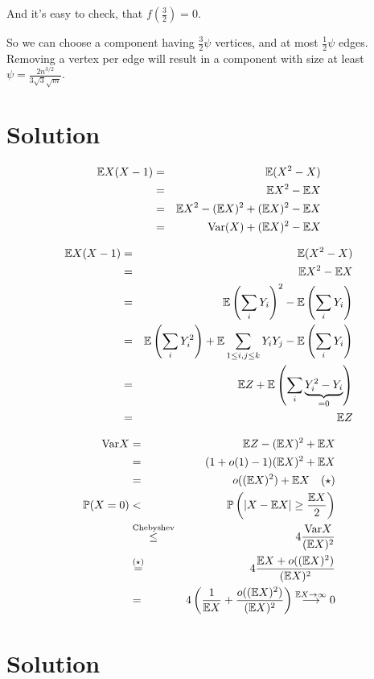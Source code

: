 \documentclass[a4paper]{article}
\begin{document}
And it's easy to check, that $ f(\frac{3}{2}) = 0 $.

So we can choose a component having $ \frac{3}{2} \psi $ vertices, and at most
$ \frac{1}{2} \psi $ edges. Removing a vertex per edge will result in
a component with size at least $ \psi = \frac{2n^{3/2}}{3\sqrt{3}\sqrt{m}} $. \endproof

\section{Solution}

\begin{eqnarray*}
  \mathbb{E} X(X-1) &=& \mathbb{E} (X^2 - X) \\
    &=& \mathbb{E} X^2 - \mathbb{E} X \\
    &=& \mathbb{E} X^2 - (\mathbb{E} X)^2 + (\mathbb{E} X)^2 - \mathbb{E} X \\
    &=& \mathrm{Var}(X) + (\mathbb{E} X)^2 - \mathbb{E} X
\end{eqnarray*}
      
\begin{eqnarray*}
  \mathbb{E} X(X-1) &=& \mathbb{E} (X^2 - X) \\
    &=& \mathbb{E} X^2 - \mathbb{E} X \\
    &=& \mathbb{E} \left(\sum_i Y_i\right)^2 - \mathbb{E} \left(\sum_i Y_i\right) \\
    &=& \mathbb{E} \left(\sum_i Y_i^2\right) + \mathbb{E} \sum_{1\le i,j \le k} Y_iY_j - \mathbb{E} \left(\sum_i Y_i\right) \\
    &=& \mathbb{E} Z + \mathbb{E} \left(\sum_i \underbrace{Y_i^2 - Y_i}_{=0}\right) \\
    &=& \mathbb{E} Z
\end{eqnarray*}


\begin{eqnarray*}
  \mathrm{Var} X &=& \mathbb{E} Z - (\mathbb{E} X)^2 + \mathbb{E} X \\
    &=& (1 + o(1) - 1)(\mathbb{E} X)^2 + \mathbb{E} X \\
    &=& o((\mathbb{E} X)^2) + \mathbb{E} X \quad (\star)\\
  \mathbb{P}(X = 0) &<& \mathbb{P}\left( |X - \mathbb{E} X| \ge \frac{\mathbb{E} X}{2}\right) \\
    &\overset{\mathrm{Chebyshev}}{\le}&
          4\frac{\mathrm{Var} X}{(\mathbb{E} X)^2} \\
    &\overset{(\star)}{=}& 4\frac{\mathbb{E} X + o((\mathbb{E} X)^2)}{(\mathbb{E} X)^2} \\
    &=& 4\left( \frac{1}{\mathbb{E} X} + \frac{o((\mathbb{E} X)^2)}{(\mathbb{E} X)^2} \right) \overset{\mathbb{E} X\to\infty}\longrightarrow 0
\end{eqnarray*}

\section{Solution}
\end{document}
